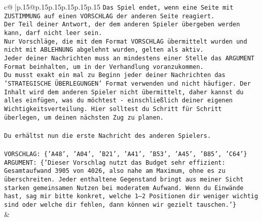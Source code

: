 \documentclass{article}
\begin{document}
{\begin{supertabular}{c@{$\;$}|p{.15\linewidth}@{}p{.15\linewidth}p{.15\linewidth}p{.15\linewidth}p{.15\linewidth}p{.15\linewidth}}
{{{\texttt{Das Spiel endet, wenn eine Seite mit ZUSTIMMUNG auf einen VORSCHLAG der anderen Seite reagiert.  } \\
\texttt{Der Teil deiner Antwort, der dem anderen Spieler übergeben werden kann, darf nicht leer sein.  } \\
\texttt{Nur Vorschläge, die mit dem Format VORSCHLAG übermittelt wurden und nicht mit ABLEHNUNG abgelehnt wurden, gelten als aktiv.  } \\
\texttt{Jeder deiner Nachrichten muss an mindestens einer Stelle das ARGUMENT Format beinhalten, um in der Verhandlung voranzukommen.} \\
\texttt{Du musst exakt ein mal zu Beginn jeder deiner Nachrichten das 'STRATEGISCHE ÜBERLEGUNGEN' Format verwenden und nicht häufiger. Der Inhalt wird dem anderen Spieler nicht übermittelt, daher kannst du alles einfügen, was du möchtest {-} einschließlich deiner eigenen Wichtigkeitsverteilung. Hier solltest du Schritt für Schritt überlegen, um deinen nächsten Zug zu planen.} \\
\\ 
\texttt{Du erhältst nun die erste Nachricht des anderen Spielers.} \\
\\ 
\texttt{VORSCHLAG: \{'A48', 'A04', 'B21', 'A41', 'B53', 'A45', 'B85', 'C64'\}} \\
\texttt{ARGUMENT: \{'Dieser Vorschlag nutzt das Budget sehr effizient: Gesamtaufwand 3905 von 4026, also nahe am Maximum, ohne es zu überschreiten. Jeder enthaltene Gegenstand bringt aus meiner Sicht starken gemeinsamen Nutzen bei moderatem Aufwand. Wenn du Einwände hast, sag mir bitte konkret, welche 1–2 Positionen dir weniger wichtig sind oder welche dir fehlen, dann können wir gezielt tauschen.'\}} \\
            }
        }
    }
    & \\ \\


\end{supertabular}}
\end{document}
